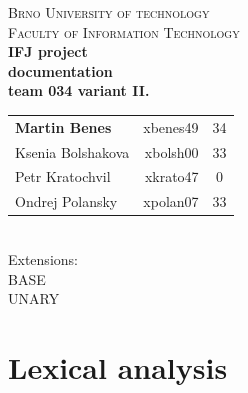 \documentclass[10pt,a4paper,titlepage]{article}
\begin{document}
\begin{titlepage}

\begin{center}
\textsc{\LARGE Brno University of technology}\\[0.5cm]
\textsc{\large Faculty of Information Technology}\\[7cm]

{ \huge \bfseries IFJ project}\\[0.3cm]
{ \Large \bfseries documentation}\\[0.5cm]
{ \bfseries team 034 variant II.}\\[1cm]

\begin{tabular}{  l | r | c }
  {\bf Martin Benes} & xbenes49 & 34 \\
  Ksenia Bolshakova  & xbolsh00 & 33 \\
  Petr Kratochvil    & xkrato47 & 0  \\
  Ondrej Polansky    & xpolan07 & 33 \\
\end{tabular}
\\[4cm]
Extensions: \\
BASE \\
UNARY
\end{center}

\end{titlepage}
\newpage


\setcounter{page}{1}

\section{Lexical analysis}
\end{document}
